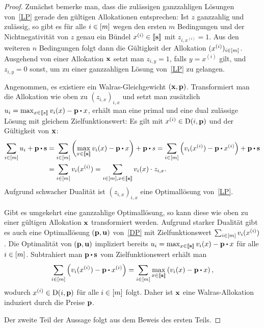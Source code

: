 \begin{proof}
	Zunächst bemerke man, dass die zulässigen ganzzahligen Lösungen von~\eqref{LP} gerade den gültigen Allokationen entsprechen:
	Ist $z$ ganzzahlig und zulässig, so gibt es für alle $i\in\left[ m \right]$ wegen den ersten $m$ Bedingungen und der Nichtnegativität von $z$ genau ein Bündel $x^{(i)}\in\left\llbracket \mathbf{s} \right\rrbracket$ mit $z_{i,x^{(i)}} = 1$.
	Aus den weiteren $n$ Bedingungen folgt dann die Gültigkeit der Allokation $(x^{(i)})_{i\in\left[ m \right]}$.
	Ausgehend von einer Allokation $\mathbf{x}$ setzt man $z_{i,y} = 1$, falls $y = x^{(i)}$ gilt, und $z_{i,y}=0$ sonst, um zu einer ganzzahligen Lösung von~\eqref{LP} zu gelangen.
	
	Angenommen, es existiere ein Walras-Gleichgewicht $(\mathbf{x}, \mathbf{p})$.
	Transformiert man die Allokation wie oben zu $(z_{i,x})_{i,x}$ und setzt man zusätzlich $u_i = \max_{x\in\ffirst{s}} v_i(x) - \fp \bcdot x$, erhält man eine primal und eine dual zulässige Lösung mit gleichem Zielfunktionswert:
	Es gilt mit $x^{(i)}\in\operatorname{D}(i, \mathbf{p})$ und der Gültigkeit von $\mathbf{x}$:
	\begin{align*}
		\sum_{i\in\first{m}} u_i + \fp \bcdot \fs
		&= \sum_{i\in\first{m}} \left( \max_{x\in\ffirst{\fs}} v_i(x) - \fp \bcdot x \right) + \fp \bcdot s = \sum_{i\in\first{m}} \left( v_i(x^{(i)}) - \fp\bcdot x^{(i)} \right) + \fp \bcdot \fs \\
		&= \sum_{i\in\first{m}} v_i(x^{(i)}) = \sum_{i\in\first{m}, x\in\ffirst{\fs}} v_i(x) \cdot z_{i,x}.
	\end{align*}
	Aufgrund schwacher Dualität ist $(z_{i,x})_{i,x}$ eine Optimallösung von~\eqref{LP}.
	
	Gibt es umgekehrt eine ganzzahlige Optimallösung, so kann diese wie oben zu einer gültigen Allokation $\mathbf{x}$ transformiert werden.
	Aufgrund starker Dualität gibt es auch eine Optimallösung $(\mathbf{p}, \mathbf{u})$ von~\eqref{DP} mit Zielfunktionswert $\sum_{i\in\left[ m \right]} v_i(x^{(i)})$.
	Die Optimalität von $(\mathbf{p}, \mathbf{u})$ impliziert bereits $u_i = \max_{x\in\ffirst{\fs}} v_i(x) - \fp \bcdot x$ für alle $i\in\left[ m \right]$.
	Subtrahiert man $\fp \bcdot \fs$ vom Zielfunktionswert erhält man 
	\[
	\sum_{i\in\first{m}} \left( v_i(x^{(i)}) - \fp \bcdot x^{(i)} \right) = \sum_{i\in\first{m}} \max_{x\in\ffirst{\fs}} \left( v_i(x) - \fp \bcdot x\right),
	\]
	wodurch $x^{(i)}\in\operatorname{D}(i, \mathbf{p})$ für alle $i\in\left[ m \right]$ folgt.
	Daher ist $\mathbf{x}$ eine Walras-Allokation induziert durch die Preise $\mathbf{p}$.
	
	Der zweite Teil der Aussage folgt aus dem Beweis des ersten Teils.
\end{proof}

